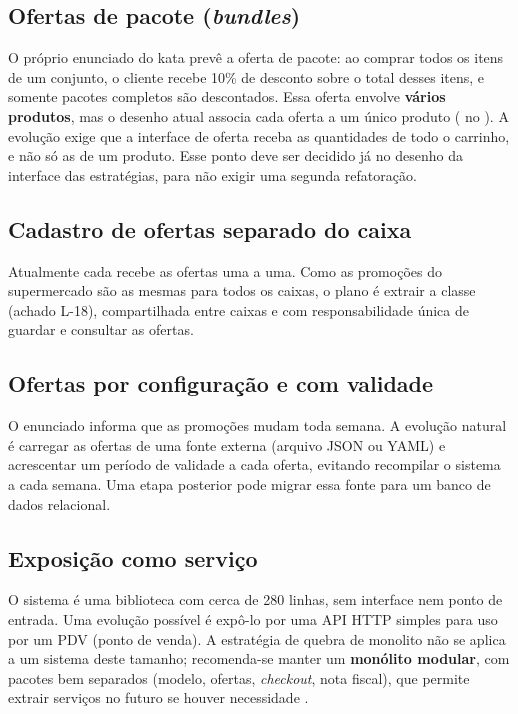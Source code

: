 \subsection{Ofertas de pacote (\textit{bundles})}
O pr\'oprio enunciado do kata prev\^e a oferta de pacote: ao comprar todos os itens de um conjunto, o cliente recebe 10\% de desconto sobre o total desses itens, e somente pacotes completos s\~ao descontados. Essa oferta envolve \textbf{v\'arios produtos}, mas o desenho atual associa cada oferta a um \'unico produto ( no ). A evolu\c{c}\~ao exige que a interface de oferta receba as quantidades de todo o carrinho, e n\~ao s\'o as de um produto. Esse ponto deve ser decidido j\'a no desenho da interface das estrat\'egias, para n\~ao exigir uma segunda refatora\c{c}\~ao.

\subsection{Cadastro de ofertas separado do caixa}
Atualmente cada  recebe as ofertas uma a uma. Como as promo\c{c}\~oes do supermercado s\~ao as mesmas para todos os caixas, o plano \'e extrair a classe  (achado L-18), compartilhada entre caixas e com responsabilidade \'unica de guardar e consultar as ofertas.

\subsection{Ofertas por configura\c{c}\~ao e com validade}
O enunciado informa que as promo\c{c}\~oes mudam toda semana. A evolu\c{c}\~ao natural \'e carregar as ofertas de uma fonte externa (arquivo JSON ou YAML) e acrescentar um per\'iodo de validade a cada oferta, evitando recompilar o sistema a cada semana. Uma etapa posterior pode migrar essa fonte para um banco de dados relacional.

\subsection{Exposi\c{c}\~ao como servi\c{c}o}
O sistema \'e uma biblioteca com cerca de 280 linhas, sem interface nem ponto de entrada. Uma evolu\c{c}\~ao poss\'ivel \'e exp\^o-lo por uma API HTTP simples para uso por um PDV (ponto de venda). A estrat\'egia de quebra de monolito n\~ao se aplica a um sistema deste tamanho; recomenda-se manter um \textbf{mon\'olito modular}, com pacotes bem separados (modelo, ofertas, \textit{checkout}, nota fiscal), que permite extrair servi\c{c}os no futuro se houver necessidade \cite{sommerville2019}.

